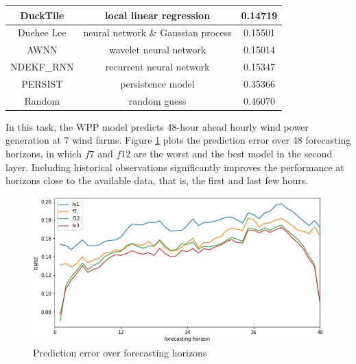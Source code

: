 \documentclass[conference]{IEEEtran}
\begin{document}
\begin{table}
\begin{center}
{\begin{tabular}{|c|c|c|}
DuckTile \cite{HONG2014357}           & local linear regression   & 0.14719           \\ \hline
Duehee Lee \cite{HONG2014357}         & neural network \& Gaussian process & 0.15501  \\ \hline
AWNN \cite{7894735}     & wavelet neural network    & 0.15014           \\ \hline
NDEKF\_RNN \cite{Kanna13} & recurrent neural network  & 0.15347           \\ \hline
PERSIST                 & persistence model         & 0.35366           \\ \hline
Random                  & random guess              & 0.46070           \\ \hline
\end{tabular}
}
\label{tab:RMSE}
\end{center}
\vspace*{-5mm}
\end{table}

In this task, the WPP model predicts 48-hour ahead hourly wind power generation at 7 wind farms. Figure \ref{fig:horizon} plots the prediction error over 48 forecasting horizons, in which $f7$ and $f12$ are the worst and the best model in the second layer. Including historical observations significantly improves the performance at horizons close to the available data, that is, the first and last few hours. %

\begin{figure}[b]
\centering
\includegraphics[width=0.8\columnwidth]{FIG/horizon}
\caption{Prediction error over forecasting horizons}
\label{fig:horizon}
\vspace*{-5mm}
\end{figure}

\end{document}
